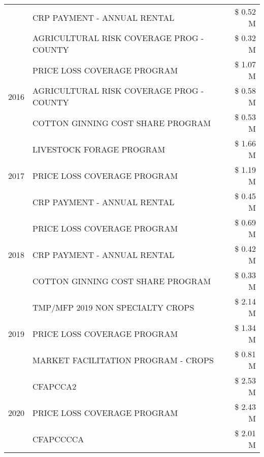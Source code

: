 \begin{tabular}{llr}
 & CRP PAYMENT - ANNUAL RENTAL & \$ 0.52 M \\
 & AGRICULTURAL RISK COVERAGE PROG - COUNTY & \$ 0.32 M \\
\cline{1-3}
\multirow[t]{3}{*}{2016} & PRICE LOSS COVERAGE PROGRAM                   & \$ 1.07 M \\
 & AGRICULTURAL RISK COVERAGE PROG - COUNTY      & \$ 0.58 M \\
 & COTTON GINNING COST SHARE PROGRAM             & \$ 0.53 M \\
\cline{1-3}
\multirow[t]{3}{*}{2017} & LIVESTOCK FORAGE PROGRAM & \$ 1.66 M \\
 & PRICE LOSS COVERAGE PROGRAM & \$ 1.19 M \\
 & CRP PAYMENT - ANNUAL RENTAL & \$ 0.45 M \\
\cline{1-3}
\multirow[t]{3}{*}{2018} & PRICE LOSS COVERAGE PROGRAM & \$ 0.69 M \\
 & CRP PAYMENT - ANNUAL RENTAL & \$ 0.42 M \\
 & COTTON GINNING COST SHARE PROGRAM & \$ 0.33 M \\
\cline{1-3}
\multirow[t]{3}{*}{2019} & TMP/MFP 2019 NON SPECIALTY CROPS & \$ 2.14 M \\
 & PRICE LOSS COVERAGE PROGRAM & \$ 1.34 M \\
 & MARKET FACILITATION PROGRAM - CROPS & \$ 0.81 M \\
\cline{1-3}
\multirow[t]{3}{*}{2020} & CFAPCCA2 & \$ 2.53 M \\
 & PRICE LOSS COVERAGE PROGRAM & \$ 2.43 M \\
 & CFAPCCCCA & \$ 2.01 M \\
\cline{1-3}
\bottomrule
\end{tabular}
